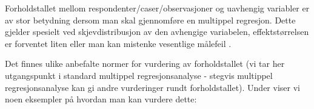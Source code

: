 \documentclass[
]{article}
\begin{document}
Forholdstallet mellom respondenter/caser/observasjoner og uavhengig variabler er av stor betydning dersom man skal gjennomføre en multippel regresjon. Dette gjelder spesielt ved skjevdistribusjon av den avhengige variabelen, effektstørrelsen er forventet liten eller man kan mistenke vesentlige målefeil \citep{tabachnikUsingMultivariateStatistics2007}.

Det finnes ulike anbefalte normer for vurdering av forholdstallet (vi tar her utgangspunkt i standard multippel regresjonsanalyse - stegvis multippel regresjonsanalyse kan gi andre vurderinger rundt forholdstallet). Under viser vi noen eksempler på hvordan man kan vurdere dette:

\providecommand{\docline}[3]{\noalign{\global\setlength{\arrayrulewidth}{#1}}\arrayrulecolor[HTML]{#2}\cline{#3}}

\setlength{\tabcolsep}{2pt}

\renewcommand*{\arraystretch}{1.5}
\end{document}
